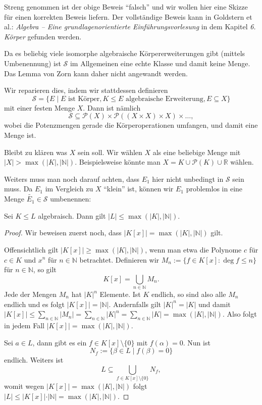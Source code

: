 \begin{remark}
    Streng genommen ist der obige Beweis ``falsch'' und wir wollen hier eine Skizze für einen korrekten Beweis liefern. Der vollständige Beweis kann in Goldstern et al.: \textit{Algebra -- Eine grundlagenorientierte Einführungsvorlesung} in dem Kapitel \textit{6. Körper} gefunden werden.

    Da es beliebig viele isomorphe algebraische Körpererweiterungen gibt (mittels Umbenennung) ist $\mathcal{S}$ im Allgemeinen eine echte Klasse und damit keine Menge. Das Lemma von Zorn kann daher nicht angewandt werden.

    Wir reparieren dies, indem wir stattdessen definieren
    $$ \mathcal{S} = \{ E \mid E \text{ ist Körper}, K \leq E \text{ algebraische Erweiterung}, E \subseteq X \} $$
    mit einer festen Menge $X$. Dann ist nämlich
    $$ \mathcal{S} \subseteq \mathcal{P}(X) \times \mathcal{P}((X \times X) \times X) \times \hdots, $$
    wobei die Potenzmengen gerade die Körperoperationen umfangen, und damit eine Menge ist.

    Bleibt zu klären was $X$ sein soll. Wir wählen $X$ als eine beliebige Menge mit $\vert X \vert > \max(\vert K \vert, \vert \mathbb{N} \vert)$. Beispielsweise könnte man $X = K \cup \mathcal{P}(K) \cup \mathbb{R}$ wählen.

    Weiters muss man noch darauf achten, dass $E_1$ hier nicht unbedingt in $\mathcal{S}$ sein muss. Da $E_1$ im Vergleich zu $X$ ``klein'' ist, können wir $E_1$ problemlos in eine Menge $\widetilde{E_1} \in \mathcal{S}$ umbenennen:
\end{remark}

\begin{proposition}\label{prop:maechtigkeit_koerpeerweiterung}
    Sei $K \leq L$ algebraisch. Dann gilt $\vert L \vert \leq \max(\vert K \vert, \vert \mathbb{N} \vert)$.
\end{proposition}

\begin{proof}
    Wir beweisen zuerst noch, dass $|K[x]|=\max(|K|,|\mathbb{N}|)$ gilt.

    Offensichtlich gilt $|K[x]|\geq \max(|K|,|\mathbb{N}|)$, wenn man etwa die Polynome $c$ für $c\in K$ und $x^n$ für $n\in\mathbb{N}$ betrachtet. Definieren wir $M_n:=\{f\in K[x]:\deg f\le n\}$ für $n\in\mathbb{N}$, so gilt $$K[x]=\bigcup_{n\in\mathbb{N}}M_n.$$ Jede der Mengen $M_n$ hat $|K|^n$ Elemente. Ist $K$ endlich, so sind also alle $M_n$ endlich und es folgt $|K[x]|=|\mathbb{N}|$. Andernfalls gilt $|K|^n=|K|$ und damit $|K[x]|\le \sum_{n\in\mathbb{N}}|M_n|=\sum_{n\in\mathbb{N}}|K|^n=\sum_{n\in\mathbb{N}}|K|=\max(|K|,|\mathbb{N}|)$. Also folgt in jedem Fall $|K[x]|=\max(|K|,|\mathbb{N}|)$.

    Sei $a \in L$, dann gibt es ein $f \in K[x] \setminus \{0\}$ mit $f(\alpha) = 0$. Nun ist
    $$ N_f := \{ \beta \in L \mid f(\beta) = 0 \} $$
    endlich. Weiters ist
    $$ L \subseteq \bigcup_{f \in K[x] \setminus \{0\}} N_f, $$
    womit wegen $\vert K[x] \vert = \max(\vert K \vert, \vert \mathbb{N} \vert)$ folgt $\vert L \vert \leq \vert K[x] \vert \cdot \vert \mathbb{N} \vert = \max(\vert K \vert, \vert \mathbb{N} \vert)$.
\end{proof}

